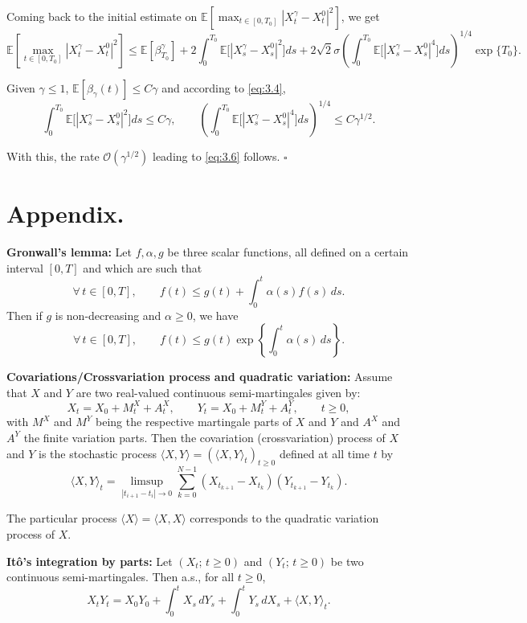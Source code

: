 \documentclass[11pt]{article}
\begin{document}
Coming back to the initial estimate on $\mathbb{E}[\max_{t\in[0,T_0]}|X_t^{\gamma}-X_t^0|^2]$, we get
\[
\mathbb{E}\left[\max_{t\in[0,T_0]}|X_t^{\gamma}-X_t^0|^2\right]
\le \mathbb{E}[\beta_{T_0}^{\gamma}]
+2\int_0^{T_0}\mathbb{E}\bigl[|X_s^{\gamma}-X_s^0|^2\bigr]ds
+2\sqrt{2}\sigma\left(\int_0^{T_0}\mathbb{E}\bigl[|X_s^{\gamma}-X_s^0|^4\bigr]ds\right)^{1/4}\exp\{T_0\}.
\]

Given $\gamma\le1$, $\mathbb{E}[\beta_{\gamma}(t)]\le C\gamma$ and according to \eqref{eq:3.4},
\[
\int_0^{T_0}\mathbb{E}\bigl[|X_s^{\gamma}-X_s^0|^2\bigr]ds\le C\gamma,
\qquad
\left(\int_0^{T_0}\mathbb{E}\bigl[|X_s^{\gamma}-X_s^0|^4\bigr]ds\right)^{1/4}\le C\gamma^{1/2}.
\]

With this, the rate $\mathcal{O}(\gamma^{1/2})$ leading to \eqref{eq:3.6} follows. \hfill $\square$


\section{Appendix.}

\noindent\textbf{Gronwall's lemma:}
Let $f,\alpha,g$ be three scalar functions, all defined on a certain interval $[0,T]$ and which are such that
\[
\forall\, t\in[0,T], \qquad f(t)\le g(t)+\int_0^t \alpha(s)f(s)\,ds.
\]
Then if $g$ is non-decreasing and $\alpha\ge0$, we have
\[
\forall\, t\in[0,T], \qquad f(t)\le g(t)\exp\left\{\int_0^t \alpha(s)\,ds\right\}.
\]

\noindent\textbf{Covariations/Crossvariation process and quadratic variation:}
Assume that $X$ and $Y$ are two real-valued continuous semi-martingales given by:
\[
X_t=X_0+M_t^X+A_t^X,\qquad Y_t=X_0+M_t^Y+A_t^Y,\qquad t\ge0,
\]
with $M^X$ and $M^Y$ being the respective martingale parts of $X$ and $Y$ and $A^X$ and $A^Y$ the finite variation parts.
Then the covariation (crossvariation) process of $X$ and $Y$ is the stochastic process $\langle X,Y\rangle=(\langle X,Y\rangle_t)_{t\ge0}$ defined at all time $t$ by
\[
\langle X,Y\rangle_t=\limsup_{|t_{i+1}-t_i|\to0}\sum_{k=0}^{N-1}(X_{t_{k+1}}-X_{t_k})(Y_{t_{k+1}}-Y_{t_k}).
\]

The particular process $\langle X\rangle=\langle X,X\rangle$ corresponds to the quadratic variation process of $X$.

\noindent\textbf{It\^o's integration by parts:}
Let $(X_t;\,t\ge0)$ and $(Y_t;\,t\ge0)$ be two continuous semi-martingales. Then a.s., for all $t\ge0$,
\[
X_tY_t=X_0Y_0+\int_0^t X_s\,dY_s+\int_0^t Y_s\,dX_s+\langle X,Y\rangle_t.
\]
\end{document}
